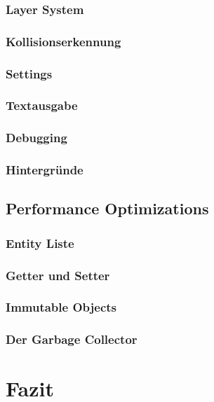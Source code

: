 		\subsubsection{Layer System}
		\subsubsection{Kollisionserkennung}
		\subsubsection{Settings}
		\subsubsection{Textausgabe}
		\subsubsection{Debugging}
		\subsubsection{Hintergründe}
	\subsection{Performance Optimizations}
		\subsubsection{Entity Liste}
		\subsubsection{Getter und Setter}
		\subsubsection{Immutable Objects}
		\subsubsection{Der Garbage Collector}
\section{Fazit}
